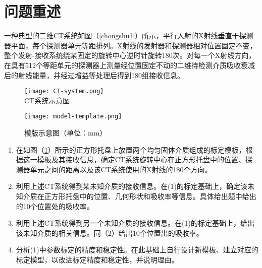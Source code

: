 \documentclass[withoutpreface,bwprint]{cumcmthesis} %
\begin{document}
\section{问题重述}
\par 一种典型的二维CT系统如图（\ref{chongshu1}）所示，平行入射的X射线垂直于探测器平面，每个探测器单元等距排列。X射线的发射器和探测器相对位置固定不变，整个发射-接收系统绕某固定的旋转中心逆时针旋转180次。对每一个X射线方向，在具有512个等距单元的探测器上测量经位置固定不动的二维待检测介质吸收衰减后的射线能量，并经过增益等处理后得到180组接收信息。

\begin{figure}[!htbp]  
\begin{minipage}[t]{0.5\textwidth}
\centering  
\texttt{[image: CT-system.png]} \\
\caption{CT系统示意图} \label{chongshu1}
\end{minipage}
\hspace{1ex}
\begin{minipage}[t]{0.5\textwidth}  
\centering  
\texttt{[image: model-template.png]}\\
\caption{模版示意图（单位：mm）}  \label{chongshu2}
\end{minipage}  
\end{figure} 

\begin{enumerate}
	\item 在如图（\ref{chongshu2}）所示的正方形托盘上放置两个均匀固体介质组成的标定模板，根据这一模板及其接收信息，确定CT系统旋转中心在正方形托盘中的位置、探测器单元之间的距离以及该CT系统使用的X射线的180个方向。
	\item 利用上述CT系统得到某未知介质的接收信息。在(1)的标定基础上，确定该未知介质在正方形托盘中的位置、几何形状和吸收率等信息。具体给出题中给出的10个位置处的吸收率。
	\item 利用上述CT系统得到另一个未知介质的接收信息。在(1)的标定基础上，给出该未知介质的相关信息。同（2）给出10个位置出的吸收率。
	\item 分析(1)中参数标定的精度和稳定性。在此基础上自行设计新模板、建立对应的标定模型，以改进标定精度和稳定性，并说明理由。
\end{enumerate}
\end{document}
